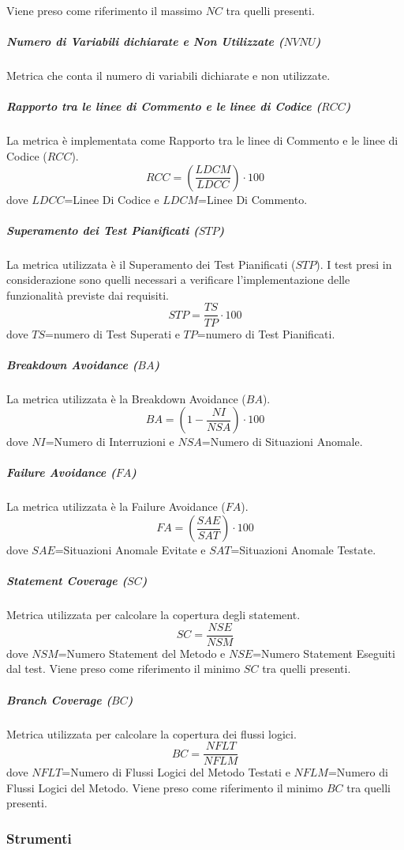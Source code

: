 				Viene preso come riferimento il massimo $NC$ tra quelli presenti.
				\subparagraph{Numero di Variabili dichiarate e Non Utilizzate ($NVNU$)} \label{NVNU}
				Metrica che conta il numero di variabili dichiarate e non utilizzate.
				\subparagraph{Rapporto tra le linee di Commento e le linee di Codice ($RCC$)} \label{RCC}
				La metrica è implementata come Rapporto tra le linee di Commento e le linee di Codice ($RCC$).
				$$RCC=\left(\frac{LDCM}{LDCC}\right)\cdot 100$$
				dove $LDCC$=Linee Di Codice e $LDCM$=Linee Di Commento.
				\subparagraph{Superamento dei Test Pianificati ($STP$)} \label{STP}
				La metrica utilizzata è il Superamento dei Test Pianificati ($STP$). I test presi in considerazione sono quelli necessari a verificare l'implementazione delle funzionalità previste dai requisiti.
				$$STP=\frac{TS}{TP}\cdot100$$
				dove $TS$=numero di Test Superati e $TP$=numero di Test Pianificati.
				\subparagraph{Breakdown Avoidance ($BA$)} \label{BA}
				La metrica utilizzata è la Breakdown Avoidance ($BA$).
				$$BA=\left( 1-\frac{NI}{NSA} \right)\cdot 100$$
				dove $NI$=Numero di Interruzioni e $NSA$=Numero di Situazioni Anomale.
				\subparagraph{Failure Avoidance ($FA$)} \label{FA}
				La metrica utilizzata è la Failure Avoidance ($FA$).
				$$FA=\left(\frac{SAE}{SAT}\right) \cdot 100$$
				dove $SAE$=Situazioni Anomale Evitate e $SAT$=Situazioni Anomale Testate.
				\subparagraph{Statement Coverage ($SC$)} \label{SC}
				Metrica utilizzata per calcolare la copertura degli statement.
				$$SC=\frac{NSE}{NSM}$$
				dove $NSM$=Numero Statement del Metodo e $NSE$=Numero Statement Eseguiti dal test.
				Viene preso come riferimento il minimo $SC$ tra quelli presenti.
				\subparagraph{Branch Coverage ($BC$)} \label{BC}
				Metrica utilizzata per calcolare la copertura dei flussi logici.
				$$BC=\frac{NFLT}{NFLM}$$
				dove $NFLT$=Numero di Flussi Logici del Metodo Testati e $NFLM$=Numero di Flussi Logici del Metodo.
				Viene preso come riferimento il minimo $BC$ tra quelli presenti.
		
		
		\subsubsection{Strumenti}
